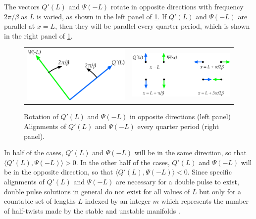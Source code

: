 \documentclass[thesis.tex]{subfiles}
\begin{document}
The vectors $Q'(L)$ and $\Psi(-L)$ rotate in opposite directions with frequency $2 \pi/\beta$ as $L$ is varied, as shown in the left panel of \cref{fig:psiqrotate}. If $Q'(L)$ and $\Psi(-L)$ are parallel at $x = L$, then they will be parallel every quarter period, which is shown in the right panel of \cref{fig:psiqrotate}.
\begin{figure}
\begin{center}
\begin{tabular}{cc}
\includegraphics[width=8cm]{images/intro/psiqrotate} &
\includegraphics[width=8cm]{images/intro/psiqoneperiod}
\end{tabular}
\caption{Rotation of $Q'(L)$ and $\Psi(-L)$ in opposite directions (left panel) Alignments of $Q'(L)$ and $\Psi(-L)$ every quarter period (right panel).}
\label{fig:psiqrotate}
\end{center}
\end{figure}
In half of the cases, $Q'(L)$ and $\Psi(-L)$ will be in the same direction, so that $\langle Q'(L), \Psi(-L) \rangle > 0$. In the other half of the cases, $Q'(L)$ and $\Psi(-L)$ will be in the opposite direction, so that $\langle Q'(L), \Psi(-L) \rangle < 0$. Since specific alignments of $Q'(L)$ and $\Psi(-L)$ are necessary for a double pulse to exist, double pulse solutions in general do not exist for all values of $L$ but only for a countable set of lengths $L$ indexed by an integer $m$ which represents the number of half-twists made by the stable and unstable manifolds \cite{SandstedeStrut}.  
\end{document}
